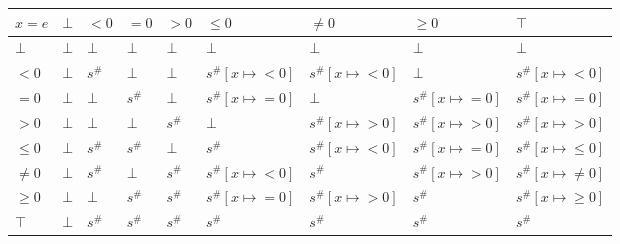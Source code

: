 \documentclass{article}
\begin{document}
\begin{table}
    \begin{tabular}{|l|l|l|l|l|l|l|l|l|}
    \hline
    $x = e$ & $\bot$ & $<0$   & $=0$   & $>0$   & $\le 0$              & $\ne 0$              & $\ge 0$              & $\top$                  \\ \hline
    $\bot$  & $\bot$ & $\bot$ & $\bot$ & $\bot$ & $\bot$               & $\bot$               & $\bot$               & $\bot$                  \\ \hline
    $<0$    & $\bot$ & $s^\#$ & $\bot$ & $\bot$ & $s^\#[x \mapsto <0]$ & $s^\#[x \mapsto <0]$ & $\bot$               & $s^\#[x \mapsto <0]$    \\ \hline
    $=0$    & $\bot$ & $\bot$ & $s^\#$ & $\bot$ & $s^\#[x \mapsto =0]$ & $\bot$               & $s^\#[x \mapsto =0]$ & $s^\#[x \mapsto =0]$    \\ \hline
    $>0$    & $\bot$ & $\bot$ & $\bot$ & $s^\#$ & $\bot$               & $s^\#[x \mapsto >0]$ & $s^\#[x \mapsto >0]$ & $s^\#[x \mapsto >0]$    \\ \hline
    $\le 0$ & $\bot$ & $s^\#$ & $s^\#$ & $\bot$ & $s^\#$               & $s^\#[x \mapsto <0]$ & $s^\#[x \mapsto =0]$ & $s^\#[x \mapsto \le 0]$ \\ \hline
    $\ne 0$ & $\bot$ & $s^\#$ & $\bot$ & $s^\#$ & $s^\#[x \mapsto <0]$ & $s^\#$               & $s^\#[x \mapsto >0]$ & $s^\#[x \mapsto \ne 0]$ \\ \hline
    $\ge 0$ & $\bot$ & $\bot$ & $s^\#$ & $s^\#$ & $s^\#[x \mapsto =0]$ & $s^\#[x \mapsto >0]$ & $s^\#$               & $s^\#[x \mapsto \ge 0]$ \\ \hline
    $\top$  & $\bot$ & $s^\#$ & $s^\#$ & $s^\#$ & $s^\#$               & $s^\#$               & $s^\#$               & $s^\#$                  \\ \hline
    \end{tabular}
    \end{table}
\end{document}
